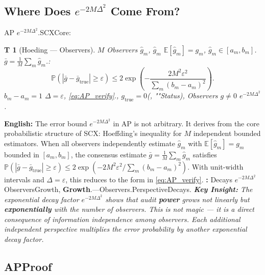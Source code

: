 \documentclass[12pt,a4paper]{article}
\theoremstyle{plain}
\newtheorem{theorem}Theorem[section]
\theoremstyle{definition}
\theoremstyle{remark}
\newcommand{\E}{\mathbb{E}}
\newcommand{\Pbb}{\mathbb{P}}
\begin{document}
\subsection{Where Does $e^{-2M\Delta^2}$ Come From?}
AP $e^{-2M\Delta^2}$.SCXCore: 
\vspace{4pt}
\begin{theorem}[Hoeding --- Observers]\label{thm:hoeffding_consensus}
 $M$ Observers $\hat{g}_m$, $\hat{g}_m$ $\E[\hat{g}_m] = g_m$, $\hat{g}_m \in [a_m, b_m]$. $\bar{g} = \frac{1}{M}\sum_m \hat{g}_m$.: 
\begin{equation}\label{eq:hoeffding_full}
 \Pbb\left(|\bar{g} - \bar{g}_{\text{true}}| \geq \varepsilon\right) \leq 2\exp\left(-\frac{2M^2\varepsilon^2}{\sum_m (b_m - a_m)^2}\right).
\end{equation}
 $b_m - a_m = 1$ $\Delta = \varepsilon$, \eqref{eq:AP_verify}., $g_{\text{true}} = 0$(, ""Status), Observers $g \neq 0$ $e^{-2M\Delta^2}$.
\end{theorem}
\vspace{4pt}
\noindent
\textbf{English:} The error bound $e^{-2M\Delta^2}$ in AP is not arbitrary. It derives from the core probabilistic structure of SCX: Hoeffding's inequality for $M$ independent bounded estimators. When all observers independently estimate $\hat{g}_m$ with $\E[\hat{g}_m] = g_m$ bounded in $[a_m,b_m]$, the consensus estimate $\bar{g} = \frac{1}{M}\sum_m \hat{g}_m$ satisfies $\Pbb(|\bar{g} - \bar{g}_{\text{true}}| \geq \varepsilon) \leq 2\exp(-2M^2\varepsilon^2/\sum_m(b_m-a_m)^2)$. With unit-width intervals and $\Delta = \varepsilon$, this reduces to the form in \eqref{eq:AP_verify}.
\vspace{6pt}
\textbf{: } Decays $e^{-2M\Delta^2}$ ObserversGrowth, \textbf{Growth}.---Observers.PerspectiveDecays.
\vspace{4pt}
\noindent
\textit{\textbf{Key Insight:} The exponential decay factor $e^{-2M\Delta^2}$ shows that audit \textbf{power} grows not linearly but \textbf{exponentially} with the number of observers. This is not magic --- it is a direct consequence of information independence among observers. Each additional independent perspective multiplies the error probability by another exponential decay factor.}
\subsection{APProof}
\end{document}
